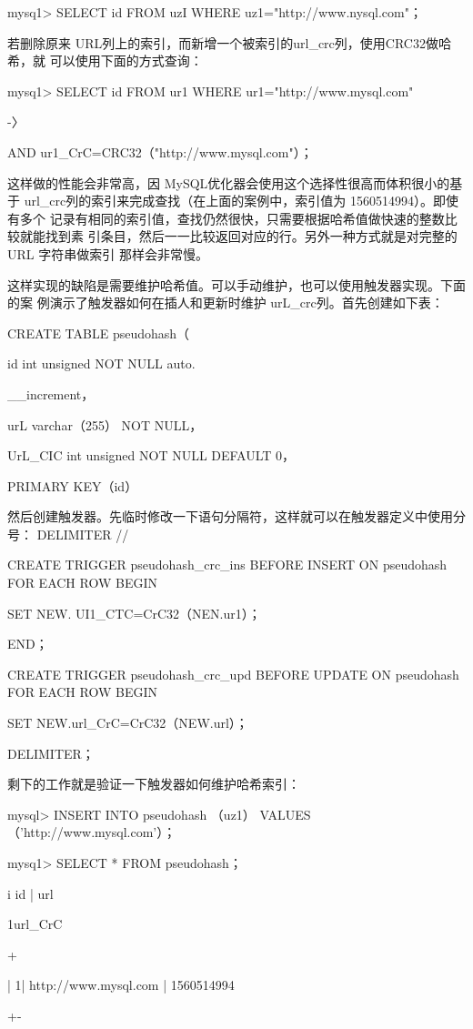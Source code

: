 mysq1> SELECT id FROM uzI WHERE uz1="http://www.nysql.com"；

若删除原来 URL列上的索引，而新增一个被索引的url\_crc列，使用CRC32做哈希，就
可以使用下面的方式查询：

mysq1> SELECT id FROM ur1 WHERE ur1="http://www.mysql.com"

-〉

AND ur1\_CrC=CRC32（"http://www.mysql.com"）；

这样做的性能会非常高，因 MySQL优化器会使用这个选择性很高而体积很小的基于
url\_crc列的索引来完成查找（在上面的案例中，索引值为 1560514994）。即使有多个
记录有相同的索引值，查找仍然很快，只需要根据哈希值做快速的整数比较就能找到素
引条目，然后一一比较返回对应的行。另外一种方式就是对完整的 URL 字符串做索引
那样会非常慢。

这样实现的缺陷是需要维护哈希值。可以手动维护，也可以使用触发器实现。下面的案
例演示了触发器如何在插人和更新时维护 urL\_crc列。首先创建如下表：

CREATE TABLE pseudohash（

id int unsigned NOT NULL auto.

\_\_increment，

urL varchar（255） NOT NULL，

UrL\_CIC int unsigned NOT NULL DEFAULT 0，

PRIMARY KEY（id）

然后创建触发器。先临时修改一下语句分隔符，这样就可以在触发器定义中使用分号：
DELIMITER //

CREATE TRIGGER pseudohash\_crc\_ins BEFORE INSERT ON pseudohash FOR EACH ROW BEGIN

SET NEW. UI1\_CTC=CrC32（NEN.ur1）；

END；

CREATE TRIGGER pseudohash\_crc\_upd BEFORE UPDATE ON pseudohash FOR EACH ROW BEGIN

SET NEW.url\_CrC=CrC32（NEW.url）；

DELIMITER；

剩下的工作就是验证一下触发器如何维护哈希索引：

mysql> INSERT INTO pseudohash （uz1） VALUES （'http://www.mysql.com'）；

mysq1> SELECT * FROM pseudohash；

i id | url

1url\_CrC

+

| 1| http://www.mysql.com | 1560514994

+-

